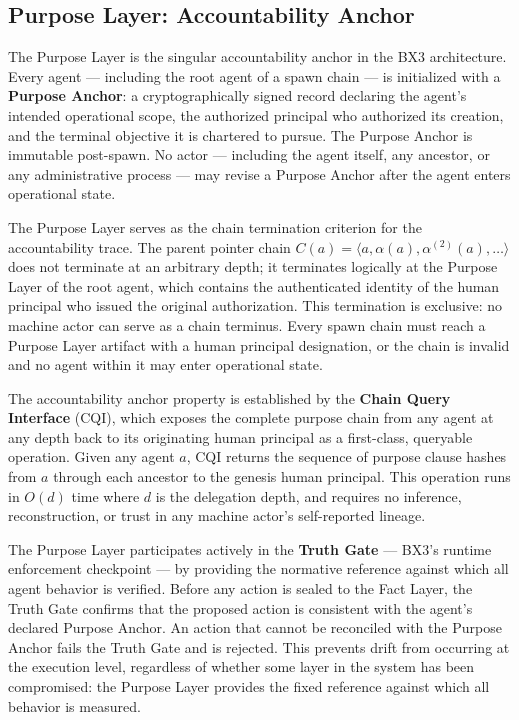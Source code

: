 \subsection{Purpose Layer: Accountability Anchor}

The Purpose Layer is the singular accountability anchor in the BX3 architecture. Every agent — including the root agent of a spawn chain — is initialized with a \textbf{Purpose Anchor}: a cryptographically signed record declaring the agent's intended operational scope, the authorized principal who authorized its creation, and the terminal objective it is chartered to pursue. The Purpose Anchor is immutable post-spawn. No actor — including the agent itself, any ancestor, or any administrative process — may revise a Purpose Anchor after the agent enters operational state.

The Purpose Layer serves as the chain termination criterion for the accountability trace. The parent pointer chain $C(a) = \langle a, \alpha(a), \alpha^{(2)}(a), \ldots \rangle$ does not terminate at an arbitrary depth; it terminates logically at the Purpose Layer of the root agent, which contains the authenticated identity of the human principal who issued the original authorization. This termination is exclusive: no machine actor can serve as a chain terminus. Every spawn chain must reach a Purpose Layer artifact with a human principal designation, or the chain is invalid and no agent within it may enter operational state.

The accountability anchor property is established by the \textbf{Chain Query Interface} (CQI), which exposes the complete purpose chain from any agent at any depth back to its originating human principal as a first-class, queryable operation. Given any agent $a$, CQI returns the sequence of purpose clause hashes from $a$ through each ancestor to the genesis human principal. This operation runs in $O(d)$ time where $d$ is the delegation depth, and requires no inference, reconstruction, or trust in any machine actor's self-reported lineage.

The Purpose Layer participates actively in the \textbf{Truth Gate} — BX3's runtime enforcement checkpoint — by providing the normative reference against which all agent behavior is verified. Before any action is sealed to the Fact Layer, the Truth Gate confirms that the proposed action is consistent with the agent's declared Purpose Anchor. An action that cannot be reconciled with the Purpose Anchor fails the Truth Gate and is rejected. This prevents drift from occurring at the execution level, regardless of whether some layer in the system has been compromised: the Purpose Layer provides the fixed reference against which all behavior is measured.

